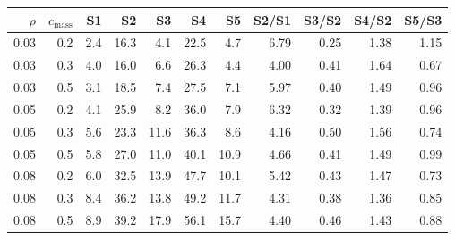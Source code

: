 \begin{tabular}{rrrrrrrrrrr}
\toprule
$\rho$ & $c_{\text{mass}}$ & S1 & S2 & S3 & S4 & S5 & S2/S1 & S3/S2 & S4/S2 & S5/S3 \\
\midrule
0.03 & 0.2 & 2.4 & 16.3 & 4.1 & 22.5 & 4.7 & 6.79 & 0.25 & 1.38 & 1.15 \\
0.03 & 0.3 & 4.0 & 16.0 & 6.6 & 26.3 & 4.4 & 4.00 & 0.41 & 1.64 & 0.67 \\
0.03 & 0.5 & 3.1 & 18.5 & 7.4 & 27.5 & 7.1 & 5.97 & 0.40 & 1.49 & 0.96 \\
0.05 & 0.2 & 4.1 & 25.9 & 8.2 & 36.0 & 7.9 & 6.32 & 0.32 & 1.39 & 0.96 \\
0.05 & 0.3 & 5.6 & 23.3 & 11.6 & 36.3 & 8.6 & 4.16 & 0.50 & 1.56 & 0.74 \\
0.05 & 0.5 & 5.8 & 27.0 & 11.0 & 40.1 & 10.9 & 4.66 & 0.41 & 1.49 & 0.99 \\
0.08 & 0.2 & 6.0 & 32.5 & 13.9 & 47.7 & 10.1 & 5.42 & 0.43 & 1.47 & 0.73 \\
0.08 & 0.3 & 8.4 & 36.2 & 13.8 & 49.2 & 11.7 & 4.31 & 0.38 & 1.36 & 0.85 \\
0.08 & 0.5 & 8.9 & 39.2 & 17.9 & 56.1 & 15.7 & 4.40 & 0.46 & 1.43 & 0.88 \\
\bottomrule
\end{tabular}